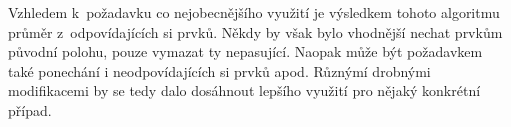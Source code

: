 Vzhledem k~požadavku co nejobecnějšího využití je výsledkem tohoto algoritmu
průměr z~odpovídajících si prvků.  Někdy by však bylo vhodnější nechat prvkům
původní polohu, pouze vymazat ty nepasující. Naopak může být požadavkem také
ponechání i neodpovídajících si prvků apod. Různýmí drobnými modifikacemi
by se tedy dalo dosáhnout lepšího využití pro nějaký konkrétní případ.
